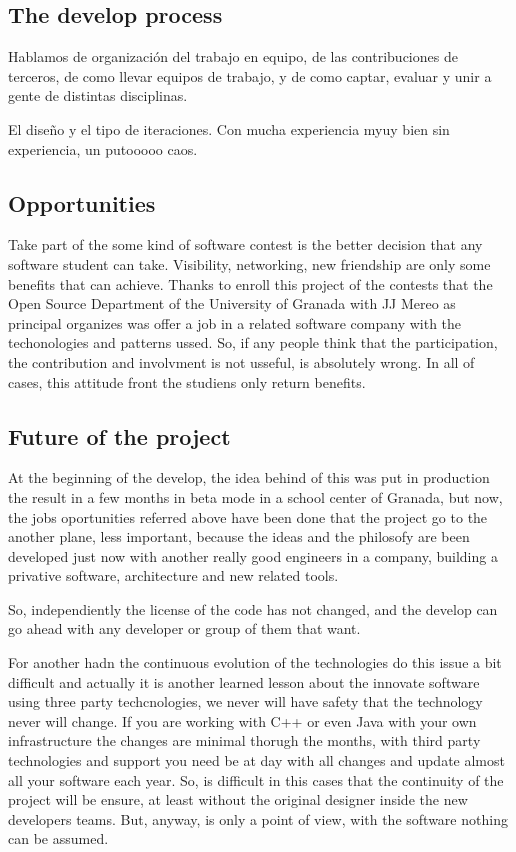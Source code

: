 \subsection{The develop process}

Hablamos de organización del trabajo en equipo, de las contribuciones de terceros,
de como llevar equipos de trabajo, y de como captar, evaluar y unir a gente de
distintas disciplinas.

El diseño y el tipo de iteraciones. Con mucha experiencia myuy bien
sin experiencia, un putooooo caos.



\subsection{Opportunities}

Take part of the some kind of software contest is the better decision that any
software student can take. Visibility, networking, new friendship are only some
benefits that can achieve.
Thanks to enroll this project of the contests that the Open Source Department of
 the University of Granada with JJ Mereo as principal organizes was offer a job
 in a related software company with the techonologies and patterns ussed.
So, if any people think that the participation, the contribution and involvment
is not usseful, is absolutely wrong. In all of cases, this attitude front the
studiens only return benefits.

\subsection{Future of the project}

At the beginning of the develop, the idea behind of this was put in production
the result in a few months in beta mode in a school center of Granada, but now,
the jobs oportunities referred above have been done that the project go to the
another plane, less important, because the ideas and the philosofy are been
developed just now with another really good engineers in a company, building a
privative software, architecture and new related tools.

So, independiently the license of the code has not changed, and the develop can
 go ahead with any developer or group of them that want.

For another hadn the continuous evolution of the technologies do this issue a
bit difficult and actually it is another learned lesson about the innovate
software using three party techcnologies, we never will have safety that the
technology never will change. If you are working with C++ or even Java with your
own infrastructure the changes are minimal thorugh the months, with third party
technologies and support you need be at day with all changes and update almost
all your software each year. So, is difficult in this cases that the continuity
of the project will be ensure, at least without the original designer inside the
new developers teams. But, anyway, is only a point of view, with the software
nothing can be assumed.

